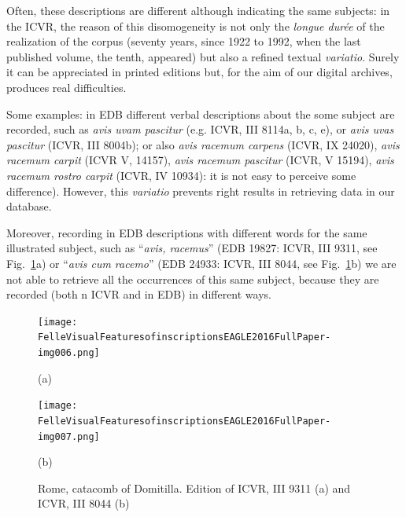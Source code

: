\documentclass[amsthm,ebook]{saparticle}
\begin{document}
Often, these descriptions are different although indicating the same subjects: in the ICVR, the reason of this
disomogeneity is not only the \emph{longue durée} of the realization of the corpus (seventy years, since 1922 to 1992, when
the last published volume, the tenth, appeared) but also a refined textual \emph{variatio}. Surely it can be appreciated in
printed editions but, for the aim of our digital archives, produces real difficulties. 

Some examples: in EDB different verbal descriptions about the some subject are recorded, such as \emph{avis uvam pascitur}
(e.g. ICVR, III 8114a, b, c, e), or \emph{avis uvas pascitur} (ICVR, III 8004b); or also \emph{avis racemum carpens} (ICVR, IX
24020), \emph{avis racemum carpit} (ICVR V, 14157), \emph{avis racemum pascitur} (ICVR, V 15194), \emph{avis racemum rostro carpit} (ICVR,
IV 10934): it is not easy to perceive some difference). However, this \emph{variatio} prevents right results in retrieving
data in our database. 

Moreover, recording in EDB descriptions with different words for the same illustrated subject, such as
``\emph{avis, racemus}'' (EDB 19827: ICVR, III 9311, see Fig.~\ref{fig:5}a) or ``\emph{avis cum
racemo}'' (EDB 24933: ICVR, III 8044, see Fig.~\ref{fig:5}b) we are not able to retrieve all the occurrences of this
same subject, because they are recorded (both n ICVR and in EDB) in different ways.




\begin{figure}[!htp]
\centering
\begin{minipage}[b]{0.45\textwidth}
 \texttt{[image: FelleVisualFeaturesofinscriptionsEAGLE2016FullPaper-img006.png]}
\begin{center}
 \footnotesize(a)
 \end{center}
\end{minipage}
\begin{minipage}[b]{0.45\textwidth}
 \texttt{[image: FelleVisualFeaturesofinscriptionsEAGLE2016FullPaper-img007.png]}
 \begin{center}
 \footnotesize(b)
 \end{center}
\end{minipage}

\caption{Rome, catacomb of Domitilla. Edition of ICVR, III 9311 (a) and ICVR, III 8044 (b)}
\label{fig:5}
\end{figure}
\end{document}
